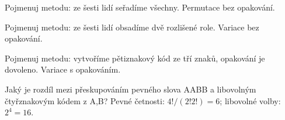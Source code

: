 \documentclass[11pt,a4paper]{article}
\begin{document}
\begin{zadaniReseniBox}[title={Samostatná práce 1}]
Pojmenuj metodu: ze šesti lidí seřadíme všechny.
\tcblower
Permutace bez opakování.
\end{zadaniReseniBox}



\begin{zadaniReseniBox}[title={Samostatná práce 2}]
Pojmenuj metodu: ze šesti lidí obsadíme dvě rozlišené role.
\tcblower
Variace bez opakování.
\end{zadaniReseniBox}



\begin{zadaniReseniBox}[title={Samostatná práce 3}]
Pojmenuj metodu: vytvoříme pětiznakový kód ze tří znaků, opakování je dovoleno.
\tcblower
Variace s opakováním.
\end{zadaniReseniBox}




\begin{zadaniReseniBox}[title={Rozšíření 1}]
Jaký je rozdíl mezi přeskupováním pevného slova AABB a libovolným čtyřznakovým kódem z A,B?
\tcblower
Pevné četnosti: $4!/(2!2!)=6$; libovolné volby: $2^4=16$.
\end{zadaniReseniBox}




\end{document}
